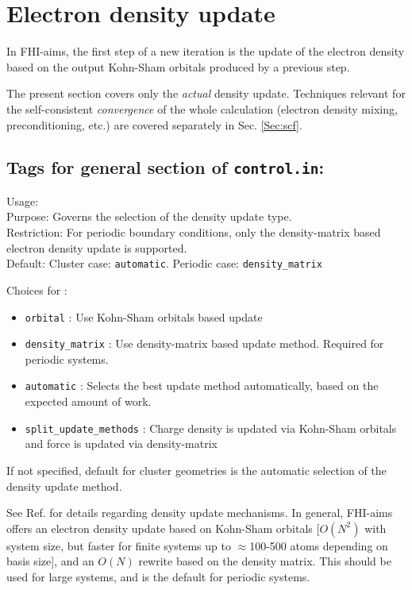 \section{Electron density update}
\label{Sec:density_update}

In FHI-aims, the first step of a new iteration is the update of the
electron density based on the output Kohn-Sham orbitals produced by a
previous step. 

The present section covers only the \emph{actual}
density update. Techniques relevant for the self-consistent
\emph{convergence} of the whole calculation (electron density mixing,
preconditioning, etc.) are covered separately in Sec. \ref{Sec:scf}.

\newpage

\subsection*{Tags for general section of \texttt{control.in}:}

{
  \noindent
  Usage:   \\[1.0ex]
  Purpose: Governs the selection of the density update
  type.\\[1.0ex]
  Restriction: For periodic boundary conditions, only the density-matrix 
    based electron density update is supported. \\[1.0ex] 
  Default: Cluster case: \texttt{automatic}. 
    Periodic case: \texttt{density\_matrix} \\ 
}

Choices for :
\begin{itemize}
  \item \texttt{orbital} : Use Kohn-Sham orbitals based update
  \item \texttt{density\_matrix} : Use density-matrix based update
    method. Required for periodic systems. 
  \item \texttt{automatic} : Selects the best
    update method automatically, based on the expected amount of
    work. 
  \item \texttt{split\_update\_methods} : Charge density is
     updated via Kohn-Sham orbitals and force is updated via density-matrix
\end{itemize} 
If not specified, default for cluster geometries is the automatic selection of the
density update method.

See Ref. \cite{Blum08} for details regarding density update
mechanisms. In general, FHI-aims offers an electron density update
based on Kohn-Sham orbitals [$O(N^2)$ with system size, but faster for
finite systems up to $\approx$100-500 atoms depending on basis
size], and an $O(N)$ rewrite based on the density matrix. This should
be used for large systems, and is the default for periodic systems.

